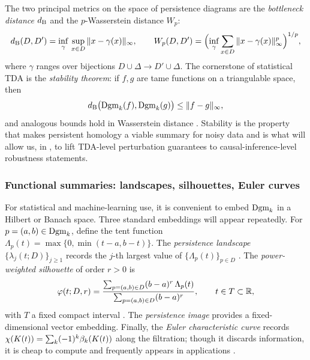The two principal metrics on the space of persistence diagrams are the
\emph{bottleneck distance} $d_{\mathrm{B}}$ and the $p$-Wasserstein distance $W_p$:
\begin{equation}
  d_{\mathrm{B}}(D, D') = \inf_{\gamma} \, \sup_{x \in D} \|x - \gamma(x)\|_\infty,
  \qquad
  W_p(D, D') = \Bigl( \inf_{\gamma} \sum_{x \in D} \|x - \gamma(x)\|_\infty^p \Bigr)^{1/p},
  \label{eq:bottleneck}
\end{equation}
where $\gamma$ ranges over bijections $D \cup \Delta \to D' \cup \Delta$.
The cornerstone of statistical TDA is the \emph{stability theorem}: if $f,g$
are tame functions on a triangulable space, then
\begin{equation}
  d_{\mathrm{B}}\bigl(\mathrm{Dgm}_k(f), \mathrm{Dgm}_k(g)\bigr) \le \|f - g\|_\infty,
  \label{eq:stability}
\end{equation}
and analogous bounds hold in Wasserstein distance
\citep{cohen2007stability,chazal2016structure}. Stability is the property
that makes persistent homology a viable summary for noisy data and is what
will allow us, in , to lift TDA-level perturbation
guarantees to causal-inference-level robustness statements.

\subsubsection{Functional summaries: landscapes, silhouettes, Euler curves}

For statistical and machine-learning use, it is convenient to embed
$\mathrm{Dgm}_k$ in a Hilbert or Banach space. Three standard embeddings will
appear repeatedly. For $p = (a,b) \in \mathrm{Dgm}_k$, define the tent function
$\Lambda_p(t) = \max\{0, \min(t-a, b-t)\}$. The
\emph{persistence landscape}
$\{\lambda_j(t; D)\}_{j \ge 1}$ records the $j$-th largest value of
$\{\Lambda_p(t)\}_{p \in D}$ \citep{bubenik2015statistical}. The
\emph{power-weighted silhouette} of order $r > 0$ is
\begin{equation}
  \varphi(t; D, r)
  = \frac{\sum_{p = (a,b) \in D} (b - a)^r \, \Lambda_p(t)}
         {\sum_{p = (a,b) \in D} (b - a)^r}, \qquad t \in T \subset \mathbb{R},
  \label{eq:silhouette}
\end{equation}
with $T$ a fixed compact interval
\citep{chazal2014stochastic,kim2026topological}. The \emph{persistence
image} \citep{adams2017persistence} provides a fixed-dimensional vector
embedding. Finally, the \emph{Euler characteristic curve} records
$\chi(K(t)) = \sum_k (-1)^k \beta_k(K(t))$ along the filtration; though it
discards information, it is cheap to compute and frequently appears in
applications \citep{smith2025multiscale,smith2025harnessing}.

